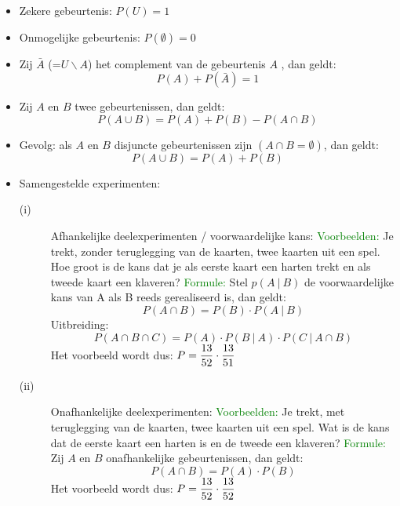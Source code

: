 \begin{itemize}
\item Zekere gebeurtenis: $P(U)=1$
\item Onmogelijke gebeurtenis: $P(\emptyset)=0$
\item Zij $\bar A$ (=$U\backslash A$)  het complement van de gebeurtenis $A$ , dan geldt: \[P(A)+P(\bar A)=1\]
\item Zij $A$ en $B$ twee gebeurtenissen, dan geldt: \[P(A\cup B)=P(A) +P(B)-P(A\cap B)\]
\item Gevolg: als $A$ en $B$ disjuncte gebeurtenissen zijn $(A\cap B=\emptyset)$, dan geldt: \[P(A\cup B)=P(A) + P(B)\]
\item Samengestelde experimenten:
\begin{description}
\item [(i)] Afhankelijke deelexperimenten / voorwaardelijke kans:\vskip 0.5cm
\textcolor{green}{Voorbeelden:} Je trekt, zonder teruglegging van de kaarten, twee kaarten uit een spel. Hoe groot is de kans dat je als eerste kaart een harten trekt en als tweede kaart een klaveren?\vskip 0.5cm
\textcolor{green}{Formule:} Stel $p(A\:|\:B)$ de voorwaardelijke kans van A als B reeds gerealiseerd is, dan geldt: \[P(A\cap B)= P(B)\cdot P(A\:|\:B)\]
Uitbreiding: \[P(A\cap B\cap C)=P(A)\cdot P(B\:|\:A)\cdot P(C\:|\:A\cap B)\]
Het voorbeeld wordt dus: $P=\displaystyle\frac{\displaystyle 13}{\displaystyle 52}\cdot \displaystyle\frac{\displaystyle 13}{\displaystyle 51}$
\item[(ii)] Onafhankelijke deelexperimenten:\vskip 0.5cm
\textcolor{green}{Voorbeelden:} Je trekt, met teruglegging van de kaarten, twee kaarten uit een spel. Wat is de kans dat de eerste kaart een harten is en de tweede een klaveren?
\vskip 0.5cm
\textcolor{green}{Formule:} Zij $A$ en $B$ onafhankelijke gebeurtenissen, dan geldt:
\[P(A\cap B)=P(A)\cdot P(B)\] 
Het voorbeeld wordt dus: $P=\displaystyle\frac{\displaystyle 13}{\displaystyle 52}\cdot \displaystyle\frac{\displaystyle 13}{\displaystyle 52}$
\end{description}
\end{itemize}


